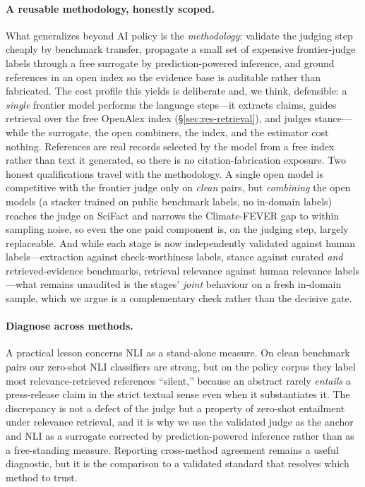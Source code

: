 \paragraph{A reusable methodology, honestly scoped.} What generalizes beyond AI policy is the
\emph{methodology}: validate the judging step cheaply by benchmark transfer, propagate a small set of
expensive frontier-judge labels through a free surrogate by prediction-powered inference, and ground
references in an open index so the evidence base is auditable rather than fabricated. The cost profile
this yields is deliberate and, we think, defensible: a \emph{single} frontier model performs the language
steps---it extracts claims, guides retrieval over the free OpenAlex index (\S\ref{sec:res-retrieval}), and
judges stance---while the surrogate, the open combiners, the index, and the estimator cost nothing. References are real
records selected by the model from a free index rather than text it generated, so there is no
citation-fabrication exposure. Two honest qualifications travel with the methodology. A single open model
is competitive with the frontier judge only on \emph{clean} pairs, but \emph{combining} the open models
(a stacker trained on public benchmark labels, no in-domain labels) reaches the judge on SciFact and
narrows the Climate-FEVER gap to within sampling noise, so even the one paid component is, on the
judging step, largely replaceable. And while each stage is now independently validated against human
labels---extraction against check-worthiness labels, stance against curated \emph{and}
retrieved-evidence benchmarks, retrieval relevance against human relevance labels---what remains
unaudited is the stages' \emph{joint} behaviour on a fresh in-domain sample, which we argue is a
complementary check rather than the decisive gate.

\paragraph{Diagnose across methods.} A practical lesson concerns NLI as a stand-alone measure. On
clean benchmark pairs our zero-shot NLI classifiers are strong, but on the policy corpus they label
most relevance-retrieved references ``silent,'' because an abstract rarely \emph{entails} a
press-release claim in the strict textual sense even when it substantiates it. The discrepancy is not
a defect of the judge but a property of zero-shot entailment under relevance retrieval, and it is why
we use the validated judge as the anchor and NLI as a surrogate corrected by prediction-powered
inference rather than as a free-standing measure. Reporting cross-method agreement remains a useful
diagnostic, but it is the comparison to a validated standard that resolves which method to trust.

